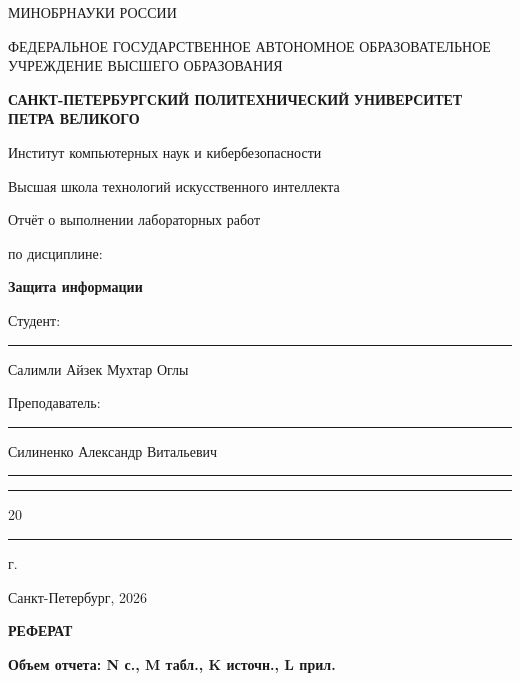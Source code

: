 \documentclass[areasetadvanced]{scrartcl}
\begin{document}
\sloppy
	\thispagestyle{empty}
	\begin{center}
		\large{МИНОБРНАУКИ РОССИИ} \par
		\vspace{0.3cm}
		\normalsize
		{ФЕДЕРАЛЬНОЕ ГОСУДАРСТВЕННОЕ АВТОНОМНОЕ ОБРАЗОВАТЕЛЬНОЕ УЧРЕЖДЕНИЕ ВЫСШЕГО ОБРАЗОВАНИЯ} \par
		\vspace{0.3cm}
		\textbf{\guillemotleft САНКТ-ПЕТЕРБУРГСКИЙ ПОЛИТЕХНИЧЕСКИЙ}
		\textbf{УНИВЕРСИТЕТ ПЕТРА ВЕЛИКОГО\guillemotright} \par
		\vspace{0.3cm}
		{Институт компьютерных наук и кибербезопасности}\par
		{Высшая школа технологий искусственного интеллекта}\par
	\end{center}
	\vfill
	\begin{center}
		{\huge Отчёт о выполнении лабораторных работ}\par
        \huge {по дисциплине:}\par
        \vspace{0.3cm}
		\Huge \textbf{Защита информации}\par
	\end{center}
	\vfill
	\begin{flushleft}
		Студент: \hspace{1.8cm} \rule[0pt]{2.5cm}{0.5pt}\hfill Салимли Айзек Мухтар Оглы\par
		\vspace{1.5cm}
		Преподаватель: \hspace{0.55cm} \rule[0pt]{2.5cm}{0.5pt}\hfill  Силиненко Александр Витальевич
	\end{flushleft}
	\vspace{0.5cm}
	\begin{flushright}
		\guillemotleft \rule[0pt]{0.8cm}{0.5pt}\guillemotright \rule[0pt]{2cm}{0.5pt} 20\rule[0pt]{0.5cm}{0.5pt} г.
	\end{flushright}
	\vfill
	\begin{center}
		Санкт-Петербург, 2026
	\end{center}

\newpage
\begin{center}
	\textbf{РЕФЕРАТ}\par
    \textbf{Объем отчета: N с., M табл., K источн., L прил.}
\end{center}
\end{document}
